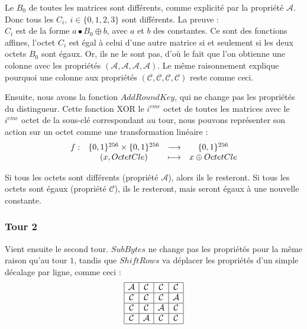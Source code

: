 \indent Le $B_0$ de toutes les matrices sont différents, comme explicité par la propriété $\mathcal{A}$. Donc tous les $C_i,\ i \in \{0,1,2,3\}$ sont différents. La preuve : \\
\indent $C_i$ est de la forme $a \bullet B_0 \oplus b$, avec $a$ et $b$ des constantes. Ce sont des fonctions affines, l'octet $C_i$ est égal à celui d'une autre matrice si et seulement si les deux octets $B_0$ sont égaux. Or, ils ne le sont pas, d'où le fait que l'on obtienne une colonne avec les propriétés $(\mathcal{A}, \mathcal{A}, \mathcal{A}, \mathcal{A})$. Le même raisonnement explique pourquoi une colonne aux propriétés $(\mathcal{C}, \mathcal{C}, \mathcal{C}, \mathcal{C})$ reste comme ceci. \\

\vspace{0.5 cm}

\indent Ensuite, nous avons la fonction $AddRoundKey$, qui ne change pas les propriétés du distingueur. Cette fonction XOR le $i^{eme}$ octet de toutes les matrices avec le $i^{eme}$ octet de la sous-clé correspondant au tour, nous pouvons représenter son action sur un octet comme une transformation linéaire : 
$$
\begin{array}{c c c c}    
    f : & \{0,1\}^{256} \times \{0,1\}^{256} & \longrightarrow & \{0,1\}^{256} \\
        & (x, OctetCle) & \longmapsto & x \oplus OctetCle
\end{array}
$$

\indent Si tous les octets sont différents (propriété $\mathcal{A}$), alors ils le resteront. Si tous les octets sont égaux (propriété $\mathcal{C}$), ils le resteront, mais seront égaux à une nouvelle constante. \\


\subsubsection{Tour 2}

\indent Vient ensuite le second tour. $SubBytes$ ne change pas les propriétés pour la même raison qu'au tour $1$, tandis que $ShiftRows$ va déplacer les propriétés d'un simple décalage par ligne, comme ceci : \\
$$
\begin{array}{|c|c|c|c|}
    \hline
    \mathcal{A} & \mathcal{C} & \mathcal{C} & \mathcal{C} \\
    \hline
    \mathcal{C} & \mathcal{C} & \mathcal{C} & \mathcal{A} \\
    \hline
    \mathcal{C} & \mathcal{C} & \mathcal{A} & \mathcal{C} \\
    \hline
    \mathcal{C} & \mathcal{A} & \mathcal{C} & \mathcal{C} \\
    \hline
\end{array}
$$

